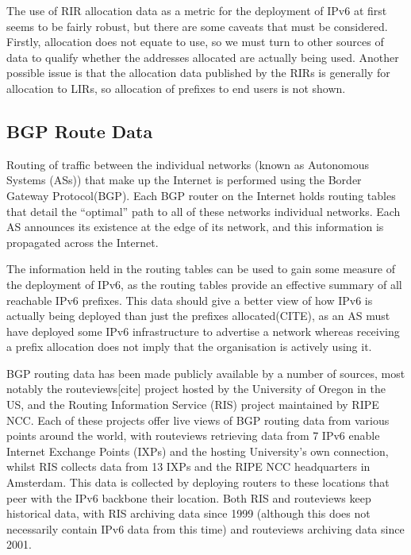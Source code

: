 The use of RIR allocation data as a metric for the deployment of IPv6 at first
seems to be fairly robust, but there are some caveats that must be considered.
Firstly, allocation does not equate to use, so we must turn to other sources of
data to qualify whether the addresses allocated are actually being used. Another
possible issue is that the allocation data published by the RIRs is generally
for allocation to LIRs, so allocation of prefixes to end users is not shown.


\subsection{BGP Route Data}

Routing of traffic between the individual networks (known as Autonomous
Systems (ASs)) that make up the Internet is performed using the Border Gateway
Protocol(BGP). Each BGP router on the Internet holds routing tables that
detail the ``optimal'' path to all of these networks individual networks.
Each AS announces its existence at the edge of its network, and this
information is propagated across the Internet.

The information held in the routing tables can be used to gain some measure of
the deployment of IPv6, as the routing tables provide an effective summary of
all reachable IPv6 prefixes. This data should give a better view of how IPv6 is
actually being deployed than just the prefixes allocated(CITE), as an AS must
have deployed some IPv6 infrastructure to advertise a network whereas receiving
a prefix allocation does not imply that the organisation is actively using it.

BGP routing data has been made publicly available by a number of sources, most
notably the routeviews[cite] project hosted by the University of Oregon in the
US, and the Routing Information Service (RIS) project maintained by RIPE NCC.
Each of these projects offer live views of BGP routing data from various points
around the world, with routeviews retrieving data from 7 IPv6 enable Internet
Exchange Points (IXPs) and the hosting University's own connection, whilst RIS
collects data from 13 IXPs and the RIPE NCC headquarters in Amsterdam. This data
is collected by deploying routers to these locations that peer with the IPv6
backbone their location. Both RIS and routeviews keep historical data, with RIS
archiving data since 1999 (although this does not necessarily contain IPv6 data
from this time) and routeviews archiving data since 2001. 

